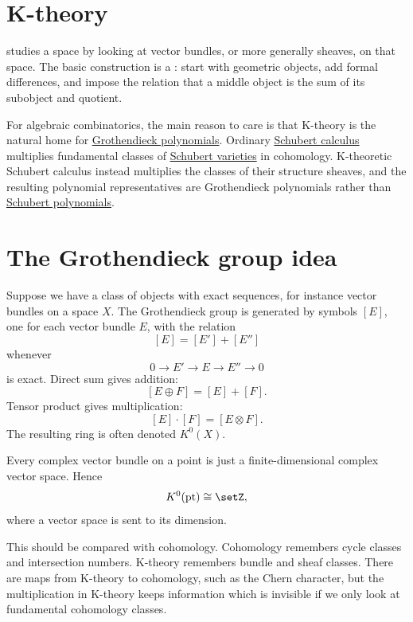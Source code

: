 
\section[kTheory]{K-theory}

 studies a space by looking at vector bundles, or more
generally sheaves, on that space.  The basic construction is a
: start with geometric objects, add formal
differences, and impose the relation that a middle object is the sum of its
subobject and quotient.

For algebraic combinatorics, the main reason to care is that K-theory is the
natural home for \hyperref[grothendieck]{Grothendieck polynomials}.  Ordinary
\hyperref[schubertCalculus]{Schubert calculus} multiplies fundamental classes
of \hyperref[schubertVarietyDefinition]{Schubert varieties} in cohomology.
K-theoretic Schubert calculus instead multiplies the classes of their
structure sheaves, and the resulting polynomial representatives are
Grothendieck polynomials rather than
\hyperref[schubert]{Schubert polynomials}.


\section[grothendieckGroup]{The Grothendieck group idea}

Suppose we have a class of objects with exact sequences, for instance vector
bundles on a space $X$.  The Grothendieck group is generated by symbols
$[E]$, one for each vector bundle $E$, with the relation
\[
  [E]=[E']+[E'']
\]
whenever
\[
  0\longrightarrow E'\longrightarrow E\longrightarrow E''
  \longrightarrow 0
\]
is exact.  Direct sum gives addition:
\[
  [E\oplus F]=[E]+[F].
\]
Tensor product gives multiplication:
\[
  [E]\cdot[F]=[E\otimes F].
\]
The resulting ring is often denoted $K^0(X)$.

\begin{example*}
Every complex vector bundle on a point is just a finite-dimensional complex
vector space.  Hence
\[
  K^0(\mathrm{pt})\cong \setZ,
\]
where a vector space is sent to its dimension.
\end{example*}

This should be compared with cohomology.  Cohomology remembers cycle classes
and intersection numbers.  K-theory remembers bundle and sheaf classes.  There
are maps from K-theory to cohomology, such as the Chern character, but the
multiplication in K-theory keeps information which is invisible if we only
look at fundamental cohomology classes.


